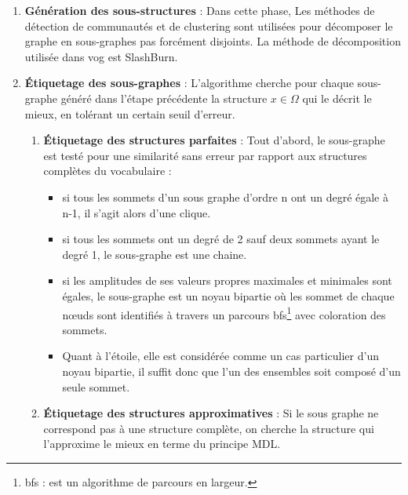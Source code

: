 \begin{enumerate}
 \item \textbf{Génération des sous-structures }: Dans cette phase, Les méthodes de détection de communautés et de clustering sont utilisées pour décomposer le graphe en sous-graphes pas forcément disjoints. La méthode de décomposition utilisée dans \gls{vog} est SlashBurn.  
 \item \textbf{Étiquetage des sous-graphes }: L'algorithme cherche pour chaque sous-graphe généré dans l'étape précédente la structure $x \in \Omega$ qui le décrit le mieux, en tolérant un certain seuil d'erreur.
  \begin{enumerate}[label=\alph*]
     \item \textbf{Étiquetage des structures parfaites} : Tout d'abord, le sous-graphe est testé pour une similarité sans erreur par rapport aux structures complètes du vocabulaire :
\begin{itemize}[label=$\circ$]
	\item si tous les sommets d'un sous graphe d'ordre n ont un degré égale à n-1, il s'agit alors d'une clique.
	\item si tous les sommets ont un degré de 2 sauf deux sommets ayant le degré 1, le  sous-graphe est une chaine.
	\item si les amplitudes de ses valeurs propres maximales et minimales sont égales, le sous-graphe est un noyau bipartie où les sommet de chaque nœuds sont identifiés à travers un parcours 
	\gls{bfs}\footnote{\gls{bfs} : est un algorithme de parcours en largeur.}	
	 avec coloration des sommets.
	\item  Quant à l'étoile, elle est considérée comme un cas particulier d'un noyau bipartie, il suffit donc que l'un des ensembles soit composé d'un seule sommet.
\end{itemize}     
     \item \textbf{Étiquetage des structures approximatives }: Si le sous graphe ne correspond pas à une structure complète, on cherche la structure qui l'approxime le mieux en terme du principe MDL.
     

\end{enumerate}
\end{enumerate}
